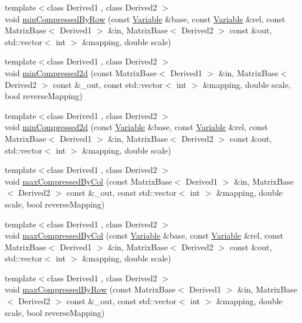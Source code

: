 \begin{DoxyCompactItemize}
\item 
{\footnotesize template$<$class Derived1 , class Derived2 $>$ }\\void \hyperlink{namespaceocra_1_1utils_af79aa2317a885467a28ba54e7b287ec8}{min\+Compressed\+By\+Row} (const \hyperlink{classocra_1_1Variable}{Variable} \&base, const \hyperlink{classocra_1_1Variable}{Variable} \&rel, const Matrix\+Base$<$ Derived1 $>$ \&in, Matrix\+Base$<$ Derived2 $>$ const \&out, std\+::vector$<$ int $>$ \&mapping, double scale)
\item 
{\footnotesize template$<$class Derived1 , class Derived2 $>$ }\\void \hyperlink{namespaceocra_1_1utils_aef09b232677b6a4a8d6177c04345f1d3}{min\+Compressed2d} (const Matrix\+Base$<$ Derived1 $>$ \&in, Matrix\+Base$<$ Derived2 $>$ const \&\+\_\+out, const std\+::vector$<$ int $>$ \&mapping, double scale, bool reverse\+Mapping)
\item 
{\footnotesize template$<$class Derived1 , class Derived2 $>$ }\\void \hyperlink{namespaceocra_1_1utils_a9b0fce276b5edf71568e40517bf567ac}{min\+Compressed2d} (const \hyperlink{classocra_1_1Variable}{Variable} \&base, const \hyperlink{classocra_1_1Variable}{Variable} \&rel, const Matrix\+Base$<$ Derived1 $>$ \&in, Matrix\+Base$<$ Derived2 $>$ const \&out, std\+::vector$<$ int $>$ \&mapping, double scale)
\item 
{\footnotesize template$<$class Derived1 , class Derived2 $>$ }\\void \hyperlink{namespaceocra_1_1utils_a9de6baf9d21a683ff798695ac099055a}{max\+Compressed\+By\+Col} (const Matrix\+Base$<$ Derived1 $>$ \&in, Matrix\+Base$<$ Derived2 $>$ const \&\+\_\+out, const std\+::vector$<$ int $>$ \&mapping, double scale, bool reverse\+Mapping)
\item 
{\footnotesize template$<$class Derived1 , class Derived2 $>$ }\\void \hyperlink{namespaceocra_1_1utils_a86da8040ccbcb2a583b7e628dc8265ea}{max\+Compressed\+By\+Col} (const \hyperlink{classocra_1_1Variable}{Variable} \&base, const \hyperlink{classocra_1_1Variable}{Variable} \&rel, const Matrix\+Base$<$ Derived1 $>$ \&in, Matrix\+Base$<$ Derived2 $>$ const \&out, std\+::vector$<$ int $>$ \&mapping, double scale)
\item 
{\footnotesize template$<$class Derived1 , class Derived2 $>$ }\\void \hyperlink{namespaceocra_1_1utils_a6216ad7fe2fb3ce0e894167f8f7d08b8}{max\+Compressed\+By\+Row} (const Matrix\+Base$<$ Derived1 $>$ \&in, Matrix\+Base$<$ Derived2 $>$ const \&\+\_\+out, const std\+::vector$<$ int $>$ \&mapping, double scale, bool reverse\+Mapping)

\end{DoxyCompactItemize}
